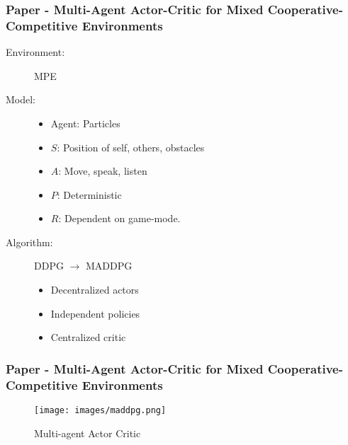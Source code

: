 \documentclass{beamer}
\begin{document}
\begin{frame} %
    \frametitle{Paper \thepapercounter - Multi-Agent Actor-Critic for Mixed 
    Cooperative-Competitive Environments}
    \begin{description}
        \item[Environment:] MPE
        \item[Model:]
        \begin{itemize} \small
            \item Agent: Particles
            \item $S$: Position of self, others, obstacles
            \item $A$: Move, speak, listen
            \item $P$: Deterministic
            \item $R$: Dependent on game-mode. 
        \end{itemize}
        \item[Algorithm:] DDPG $\rightarrow$ MADDPG
        \begin{itemize}
            \item Decentralized actors
            \item Independent policies 
            \item Centralized critic
        \end{itemize}
    \end{description}
\end{frame}

\begin{frame}
    \frametitle{Paper \thepapercounter - Multi-Agent Actor-Critic for Mixed 
    Cooperative-Competitive Environments\cite{lowe2020}}
    \begin{figure}\small
        \texttt{[image: images/maddpg.png]}
        \caption{Multi-agent Actor Critic\cite{lowe2020}}
    \end{figure}
\end{frame}
\end{document}
